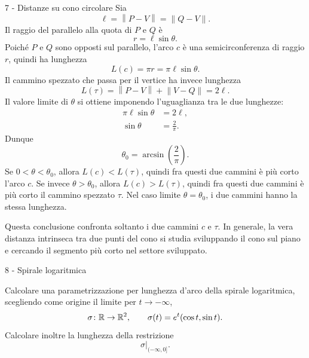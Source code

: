 \documentclass[a4paper]{article}
\begin{document}
\begin{snippetsolution}{7 - Distanze su cono circolare}
    Sia
    \[
        \ell=\left\|P-V\right\|=\left\|Q-V\right\|.
    \]
    Il raggio del parallelo alla quota di \(P\) e \(Q\) è
    \[
        r=\ell\sin\theta.
    \]
    Poiché \(P\) e \(Q\) sono opposti sul parallelo, l'arco \(c\) è una semicirconferenza di raggio \(r\), quindi ha lunghezza
    \[
        L(c)=\pi r=\pi\ell\sin\theta.
    \]
    Il cammino spezzato che passa per il vertice ha invece lunghezza
    \[
        L(\tau)=\left\|P-V\right\|+\left\|V-Q\right\|=2\ell.
    \]
    Il valore limite di \(\theta\) si ottiene imponendo l'uguaglianza tra le due lunghezze:
    \begin{align*}
        \pi\ell\sin\theta &= 2\ell,\\
        \sin\theta &= \frac{2}{\pi}.
    \end{align*}
    Dunque
    \[
        \theta_0=\arcsin\left(\frac{2}{\pi}\right).
    \]
    Se \(0<\theta<\theta_0\), allora \(L(c)<L(\tau)\), quindi fra questi due cammini è più corto l'arco \(c\). Se invece \(\theta>\theta_0\), allora \(L(c)>L(\tau)\), quindi fra questi due cammini è più corto il cammino spezzato \(\tau\). Nel caso limite \(\theta=\theta_0\), i due cammini hanno la stessa lunghezza.

    Questa conclusione confronta soltanto i due cammini \(c\) e \(\tau\). In generale, la vera distanza intrinseca tra due punti del cono si studia sviluppando il cono sul piano e cercando il segmento più corto nel settore sviluppato.
\end{snippetsolution}

\begin{snippetexercise}{8 - Spirale logaritmica}
    \begin{figure}
        \vspace{-1cm}
    \end{figure}
    Calcolare una parametrizzazione per lunghezza d'arco della
    spirale logaritmica, scegliendo come origine il limite per \(t\to-\infty\),
    \[
        \sigma\colon\mathbb{R}\to\mathbb{R}^2,
        \qquad
        \sigma(t)=e^t(\cos t,\sin t).
    \]
    Calcolare inoltre la lunghezza della restrizione
    \[
        \sigma\big|_{(-\infty,0]}.
    \]
    \wrapfill
\end{snippetexercise}
\end{document}
